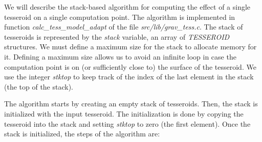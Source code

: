 \documentclass[paper,twocolumn,twoside]{geophysics}
\begin{document}
We will describe the stack-based algorithm
for computing the effect of a single tesseroid
on a single computation point.
The algorithm is implemented in function \emph{calc\_tess\_model\_adapt}
of the file \emph{src/lib/grav\_tess.c}.
The stack of tesseroids is represented by
the \emph{stack} variable,
an array of \emph{TESSEROID} structures.
We must define a maximum size for the stack to allocate memory for it.
Defining a maximum size allows us to
avoid an infinite loop
in case the computation point is on
(or sufficiently close to) the surface of the tesseroid.
We use the integer \emph{stktop}
to keep track of the index of
the last element in the stack (the top of the stack).

The algorithm starts by creating an empty stack of tesseroids.
Then, the stack is initialized with the input tesseroid.
The initialization is done by copying the tesseroid into the stack
and setting \emph{stktop} to zero (the first element).
Once the stack is initialized, the steps of the algorithm are:
\end{document}
